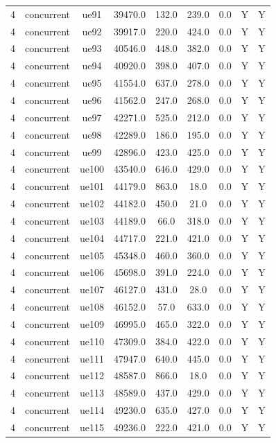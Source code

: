 \begin{table}[ht]
\begin{tabular}{|c|c|c|c|c|c|c|c|c|}
4 & concurrent & ue91 & 39470.0 & 132.0 & 239.0 & 0.0 & Y & Y \\
4 & concurrent & ue92 & 39917.0 & 220.0 & 424.0 & 0.0 & Y & Y \\
4 & concurrent & ue93 & 40546.0 & 448.0 & 382.0 & 0.0 & Y & Y \\
4 & concurrent & ue94 & 40920.0 & 398.0 & 407.0 & 0.0 & Y & Y \\
4 & concurrent & ue95 & 41554.0 & 637.0 & 278.0 & 0.0 & Y & Y \\
4 & concurrent & ue96 & 41562.0 & 247.0 & 268.0 & 0.0 & Y & Y \\
4 & concurrent & ue97 & 42271.0 & 525.0 & 212.0 & 0.0 & Y & Y \\
4 & concurrent & ue98 & 42289.0 & 186.0 & 195.0 & 0.0 & Y & Y \\
4 & concurrent & ue99 & 42896.0 & 423.0 & 425.0 & 0.0 & Y & Y \\
4 & concurrent & ue100 & 43540.0 & 646.0 & 429.0 & 0.0 & Y & Y \\
4 & concurrent & ue101 & 44179.0 & 863.0 & 18.0 & 0.0 & Y & Y \\
4 & concurrent & ue102 & 44182.0 & 450.0 & 21.0 & 0.0 & Y & Y \\
4 & concurrent & ue103 & 44189.0 & 66.0 & 318.0 & 0.0 & Y & Y \\
4 & concurrent & ue104 & 44717.0 & 221.0 & 421.0 & 0.0 & Y & Y \\
4 & concurrent & ue105 & 45348.0 & 460.0 & 360.0 & 0.0 & Y & Y \\
4 & concurrent & ue106 & 45698.0 & 391.0 & 224.0 & 0.0 & Y & Y \\
4 & concurrent & ue107 & 46127.0 & 431.0 & 28.0 & 0.0 & Y & Y \\
4 & concurrent & ue108 & 46152.0 & 57.0 & 633.0 & 0.0 & Y & Y \\
4 & concurrent & ue109 & 46995.0 & 465.0 & 322.0 & 0.0 & Y & Y \\
4 & concurrent & ue110 & 47309.0 & 384.0 & 422.0 & 0.0 & Y & Y \\
4 & concurrent & ue111 & 47947.0 & 640.0 & 445.0 & 0.0 & Y & Y \\
4 & concurrent & ue112 & 48587.0 & 866.0 & 18.0 & 0.0 & Y & Y \\
4 & concurrent & ue113 & 48589.0 & 437.0 & 429.0 & 0.0 & Y & Y \\
4 & concurrent & ue114 & 49230.0 & 635.0 & 427.0 & 0.0 & Y & Y \\
4 & concurrent & ue115 & 49236.0 & 222.0 & 421.0 & 0.0 & Y & Y \\

\end{tabular}
\end{table}
